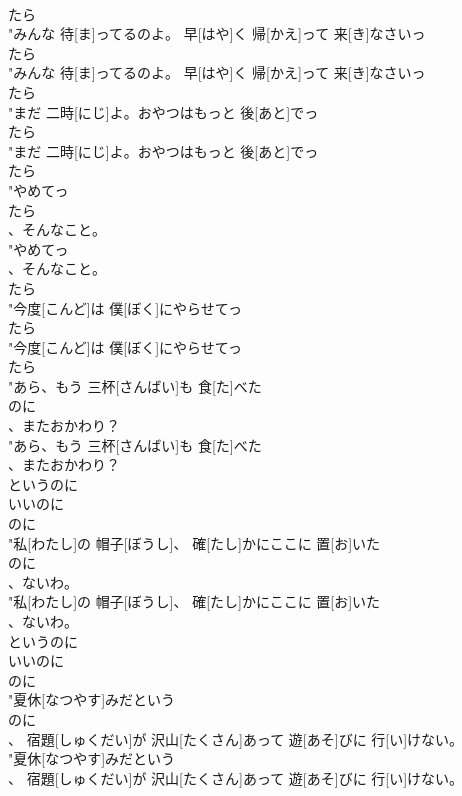 \documentclass[8pt]{extreport}
\begin{document}
\begin{CJK}{UTF8}{min}
\\	たら
\\	"みんな 待[ま]ってるのよ。 早[はや]く 帰[かえ]って 来[き]なさいっ
\\	たら
\\	"みんな 待[ま]ってるのよ。 早[はや]く 帰[かえ]って 来[き]なさいっ
\\	たら
\\	"まだ 二時[にじ]よ。おやつはもっと 後[あと]でっ
\\	たら
\\	"まだ 二時[にじ]よ。おやつはもっと 後[あと]でっ
\\	たら
\\	"やめてっ
\\	たら
\\	、そんなこと。
\\	"やめてっ
\\	、そんなこと。
\\	たら
\\	"今度[こんど]は 僕[ぼく]にやらせてっ
\\	たら
\\	"今度[こんど]は 僕[ぼく]にやらせてっ
\\	たら
\\	"あら、もう 三杯[さんばい]も 食[た]べた
\\	のに
\\	、またおかわり？
\\	"あら、もう 三杯[さんばい]も 食[た]べた
\\	、またおかわり？
\\	というのに 
\\	いいのに	
\\	のに
\\	"私[わたし]の 帽子[ぼうし]、 確[たし]かにここに 置[お]いた
\\	のに
\\	、ないわ。
\\	"私[わたし]の 帽子[ぼうし]、 確[たし]かにここに 置[お]いた
\\	、ないわ。
\\	というのに 
\\	いいのに	
\\	のに
\\	"夏休[なつやす]みだという
\\	のに
\\	、 宿題[しゅくだい]が 沢山[たくさん]あって 遊[あそ]びに 行[い]けない。
\\	"夏休[なつやす]みだという
\\	、 宿題[しゅくだい]が 沢山[たくさん]あって 遊[あそ]びに 行[い]けない。

\end{CJK}
\end{document}

